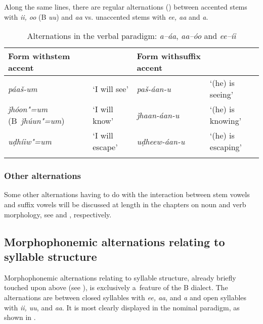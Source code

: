 Along the same lines, there are regular alternations () between accented stems with \textit{ii, oo} (B \textit{uu}) and \textit{aa} vs. unaccented stems with \textit{ee, aa} and \textit{a}.



\begin{table}[ht]
\caption{Alternations in the verbal paradigm: \textit{a--áa}, \textit{aa--óo} and \textit{ee--íi}}
\begin{tabularx}{\textwidth}{ Q l Q l }
\lsptoprule
Form with\newline stem accent &
&
Form with\newline suffix accent &
\\\hline
\textit{páaš-um} &
`I will see' &
\textit{paš-áan-u} &
`(he) is seeing'\\
\textit{ǰhóon"=um} (B~\textit{ǰhúun"=um}) &
`I will know' &
\textit{ǰhaan-áan-u} &
`(he) is knowing'\\
\textit{uḍhíiw"=um} &
`I will escape' &
\textit{uḍheew-áan-u} &
`(he) is escaping'\\\lspbottomrule
\end{tabularx}
\label{tab:3-14}
\end{table}

\subsubsection*{Other alternations}

Some other alternations having to do with the interaction between stem vowels and suffix vowels will
be discussed at length in the chapters on noun and verb morphology, see  and
, respectively.

\subsection{Morphophonemic alternations relating to syllable structure}
\label{subsec:3-5-2}


Morphophonemic alternations relating to syllable structure, already briefly touched upon above (see ), is exclusively a~feature of the B dialect. The alternations are between closed syllables with \textit{ee, aa}, and \textit{a} and open syllables with \textit{ii, uu}, and \textit{aa}. It is most clearly displayed in the nominal paradigm, as shown in .



